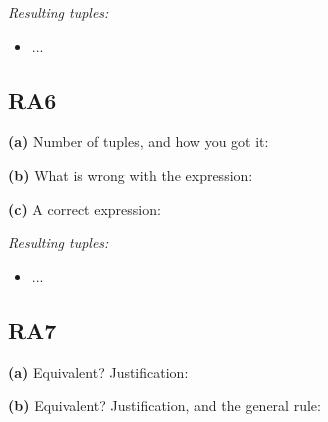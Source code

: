 \documentclass[11pt]{article}
\newcommand{\Group}[3]{\ensuremath{{}_{#1}\gamma_{#2}\left(#3\right)}}
\newcommand{\Rel}[1]{\ensuremath{\mathtt{#1}}}
\newenvironment{tuples}{\par\medskip\noindent\textit{Resulting tuples:}\begin{itemize}[nosep, leftmargin=1.6em]}{\end{itemize}\medskip}
\begin{document}
\[
\]

\begin{tuples}
  \item ...
\end{tuples}

\subsection*{RA6}

\textbf{(a)} Number of tuples, and how you got it:

\textbf{(b)} What is wrong with the expression:

\textbf{(c)} A correct expression:
\[
\]

\begin{tuples}
  \item ...
\end{tuples}

\subsection*{RA7}

\textbf{(a)} Equivalent? Justification:

\textbf{(b)} Equivalent? Justification, and the general rule:
\end{document}
